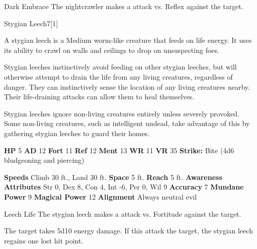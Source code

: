     \begin{freeability}{Dark Embrace}
       The nightcrawler makes a  attack
        vs. Reflex against the target.
    \end{freeability}
  
  \begin{monsection}{Stygian Leech}{7}[1]
    \vspace{-1em}\vspace{-1em}
    \vspace{0em}

    
    
        A stygian leech is a Medium worm-like creature that feeds on life energy.
        It uses its ability to crawl on walls and ceilings to drop on unsuspecting foes.
      
        Stygian leeches instinctively avoid feeding on other stygian leeches, but will otherwise attempt to drain the life from any living creatures, regardless of danger.
        They can instinctively sense the location of any living creatures nearby.
        Their life-draining attacks can allow them to heal themselves.
      
        Stygian leeches ignore non-living creatures entirely unless severely provoked.
        Some non-living creatures, such as intelligent undead, take advantage of this by gathering stygian leeches to guard their homes.
      

    \begin{spellcontent}
      \begin{spelltargetinginfo}
        \pari \textbf{HP} 5 \monsep
          \textbf{AD} 12 \monsep
          \textbf{Fort} 11 \monsep
          \textbf{Ref} 12 \monsep
          \textbf{Ment} 13
        \pari \textbf{WR} 11 \monsep
        \textbf{VR} 35
        \pari \textbf{Strike:}
            Bite  (4d6 bludgeoning and piercing)
      \end{spelltargetinginfo}
    \end{spellcontent}
    \begin{monsterfooter}
      \pari \textbf{Speeds} Climb 30 ft., Land 30 ft. \monsep
        \textbf{Space} 5 ft. \monsep
        \textbf{Reach} 5 ft.
      \pari \textbf{Awareness} 
      \pari \textbf{Attributes}
        Str 0, Dex 8,
        Con 4, Int -6,
        Per 0, Wil 9
      \pari \textbf{Accuracy} 7 \monsep
        \textbf{Mundane Power} 9 \monsep
      \textbf{Magical Power} 12
      \pari \textbf{Alignment} Always neutral evil
    \end{monsterfooter}
  \end{monsection}
  \begin{freeability}{Leech Life}
       The stygian leech makes a  attack
        vs. Fortitude against the target.
    
    \hit 
          The target takes 5d10 energy damage.
          If this attack  the target, the stygian leech regains one lost hit point.
    \end{freeability}
  
